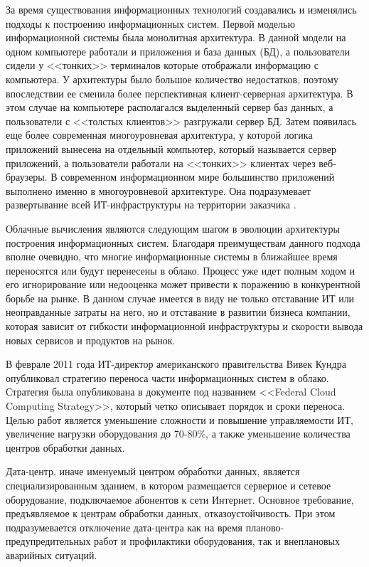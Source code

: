 За время существования информационных технологий создавались и изменялись подходы к построению информационных систем.
Первой моделью информационной системы была монолитная архитектура.
В данной модели на одном компьютере работали и приложения и база данных (БД), а пользователи сидели у <<тонких>> терминалов которые отображали информацию с компьютера.
У архитектуры было большое количество недостатков, поэтому впоследствии ее сменила более перспективная клиент-серверная архитектура.
В этом случае на компьютере располагался выделенный сервер баз данных, а пользователи с <<толстых клиентов>> разгружали сервер БД.
Затем появилась еще более современная многоуровневая архитектура, у которой логика приложений вынесена на отдельный компьютер, который называется сервер приложений, а пользователи работали на <<тонких>> клиентах через веб-браузеры.
В современном информационном мире большинство приложений выполнено именно в многоуровневой архитектуре.
Она подразумевает развертывание всей ИТ-инфраструктуры на территории заказчика \cite{oracle-db}.

Облачные вычисления являются следующим шагом в эволюции архитектуры построения информационных систем.
Благодаря преимуществам данного подхода вполне очевидно, что многие информационные системы в ближайшее время переносятся или будут перенесены в облако.
Процесс уже идет полным ходом и его игнорирование или недооценка может привести к поражению в конкурентной борьбе на рынке.
В данном случае имеется в виду не только отставание ИТ или неоправданные затраты на него, но и отставание в развитии бизнеса компании, которая зависит от гибкости информационной инфраструктуры и скорости вывода новых сервисов и продуктов на рынок.

В феврале 2011 года ИТ-директор американского правительства Вивек Кундра опубликовал стратегию переноса части информационных систем в облако.
Стратегия была опубликована в документе под названием <<Federal Cloud Computing Strategy>>, который четко описывает порядок и сроки переноса.
Целью работ является уменьшение сложности и повышение управляемости ИТ, увеличение нагрузки оборудования до 70-80\%, а также уменьшение количества центров обработки данных.

Дата-центр, иначе именуемый центром обработки данных, является специализированным зданием, в котором размещается серверное и сетевое оборудование, подключаемое абонентов к сети Интернет.
Основное требование, предъявляемое к центрам обработки данных, отказоустойчивость.
При этом подразумевается отключение дата-центра как на время планово-предупредительных работ и профилактики оборудования, так и внеплановых аварийных ситуаций.

